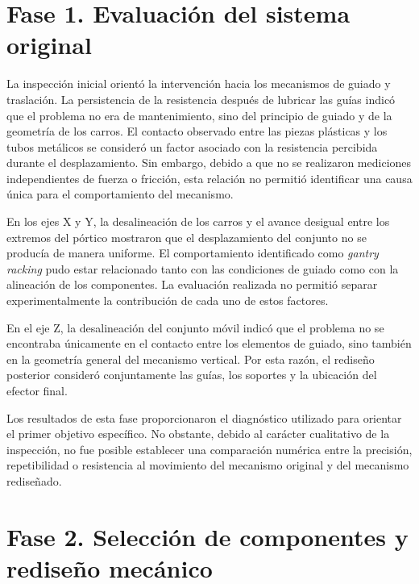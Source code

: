 
\section{Fase 1. Evaluación del sistema original}
\label{sec:discusion_fase1}

La inspección inicial orientó la intervención hacia los mecanismos de guiado y traslación. La persistencia de la resistencia después de lubricar las guías indicó que el problema no era de mantenimiento, sino del principio de guiado y de la geometría de los carros. El contacto observado entre las piezas plásticas y los tubos metálicos se consideró un factor asociado con la resistencia percibida durante el desplazamiento. Sin embargo, debido a que no se realizaron mediciones independientes de fuerza o fricción, esta relación no permitió identificar una causa única para el comportamiento del mecanismo.

En los ejes X y Y, la desalineación de los carros y el avance desigual entre los extremos del pórtico mostraron que el desplazamiento del conjunto no se producía de manera uniforme. El comportamiento identificado como \textit{gantry racking} pudo estar relacionado tanto con las condiciones de guiado como con la alineación de los componentes. La evaluación realizada no permitió separar experimentalmente la contribución de cada uno de estos factores.

En el eje Z, la desalineación del conjunto móvil indicó que el problema no se encontraba únicamente en el contacto entre los elementos de guiado, sino también en la geometría general del mecanismo vertical. Por esta razón, el rediseño posterior consideró conjuntamente las guías, los soportes y la ubicación del efector final.

Los resultados de esta fase proporcionaron el diagnóstico utilizado para orientar el primer objetivo específico. No obstante, debido al carácter cualitativo de la inspección, no fue posible establecer una comparación numérica entre la precisión, repetibilidad o resistencia al movimiento del mecanismo original y del mecanismo rediseñado.



\section{Fase 2. Selección de componentes y rediseño mecánico}
\label{sec:discusion_fase2}

